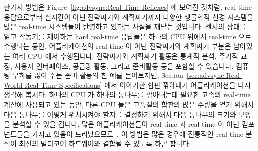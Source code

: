 한가지 방법은
Figure~\ref{fig:advsync:Real-Time Reflexes} 에 보여진 것처럼, real-time
응답으로부터 실시간이 아닌 전략짜기와 계획짜기까지 다양한 생물학적 신경
시스템을 많은 real-time 시스템들이 반영하고 있다는 사실을 깨닫는 것입니다.
센서의 상태를 읽고 작동기를 제어하는 hard real-time 응답들은 하나의 CPU 위에서
real-time 으로 수행되는 동안, 어플리케이션의 real-time 이 아닌 전략짜기와
계획짜기 부분은 남아있는 여러 CPU 에서 수행됩니다.
전략짜기와 계획짜기 활동은 통계적 분석, 주기적 교정, 사용자 인터페이스, 공급망
활동, 그리고 준비활동 등을 포함할 수 있습니다.
컴퓨팅 부하를 많이 주는 준비 활동의 한 예를 들어보자면,
Section~\ref{sec:advsync:Real-World Real-Time Specifications} 에서 이야기한
합판 깎아내기 어플리케이션을 다시 생각해 봅시다.
하나의 CPU 가 하나의 통나무를 깎아내는데 필요한 고속의 real-time 계산에
사용되고 있는 동안, 다른 CPU 들은 고품질의 합판의 많은 수량을 얻기 위해서 다음
통나무를 어떻게 위치시켜야 할지를 결정하기 위해서 다음 통나무의 크기와 모양을
분석할 수 있을 겁니다.
많은 어플리케이션들이 real-time 과 real-time 이 아닌 컴포넌트들을 가지고 있음이
드러났으므로~\cite{RobertBerry2008IBMSysJ}, 이 방법은 많은 경우에 전통적인
real-time 분석이 최신의 멀티코어 하드웨어와 결합될 수 있도록 하곤 합니다.

